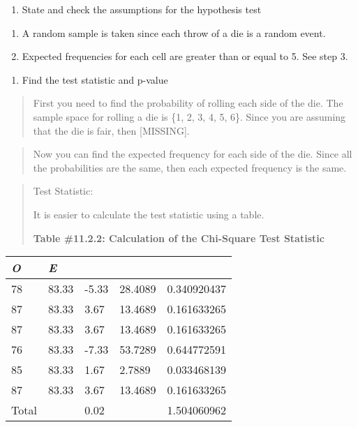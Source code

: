 \documentclass[]{book}
\providecommand{\tightlist}{%
  \setlength{\itemsep}{0pt}\setlength{\parskip}{0pt}}
\begin{document}
\begin{enumerate}
\def\labelenumi{\arabic{enumi}.}
\setcounter{enumi}{1}
\tightlist
\item
  State and check the assumptions for the hypothesis test
\end{enumerate}

\begin{enumerate}
\def\labelenumi{\alph{enumi}.}
\item
  A random sample is taken since each throw of a die is a random event.
\item
  Expected frequencies for each cell are greater than or equal to 5. See step 3.
\end{enumerate}

\begin{enumerate}
\def\labelenumi{\arabic{enumi}.}
\setcounter{enumi}{2}
\tightlist
\item
  Find the test statistic and p-value
\end{enumerate}

\begin{quote}
First you need to find the probability of rolling each side of the die. The sample space for rolling a die is \{1, 2, 3, 4, 5, 6\}. Since you are assuming that the die is fair, then {[}MISSING{]}.
\end{quote}

\begin{quote}
Now you can find the expected frequency for each side of the die. Since all the probabilities are the same, then each expected frequency is the same.
\end{quote}

\begin{quote}
Test Statistic:

It is easier to calculate the test statistic using a table.

\textbf{Table \#11.2.2: Calculation of the Chi-Square Test Statistic}
\end{quote}

\begin{longtable}[]{@{}lllll@{}}
\toprule
\emph{O} & \emph{E} & & &\tabularnewline
\midrule
\endhead
78 & 83.33 & -5.33 & 28.4089 & 0.340920437\tabularnewline
87 & 83.33 & 3.67 & 13.4689 & 0.161633265\tabularnewline
87 & 83.33 & 3.67 & 13.4689 & 0.161633265\tabularnewline
76 & 83.33 & -7.33 & 53.7289 & 0.644772591\tabularnewline
85 & 83.33 & 1.67 & 2.7889 & 0.033468139\tabularnewline
87 & 83.33 & 3.67 & 13.4689 & 0.161633265\tabularnewline
Total & & 0.02 & & 1.504060962\tabularnewline
\bottomrule
\end{longtable}
\end{document}
